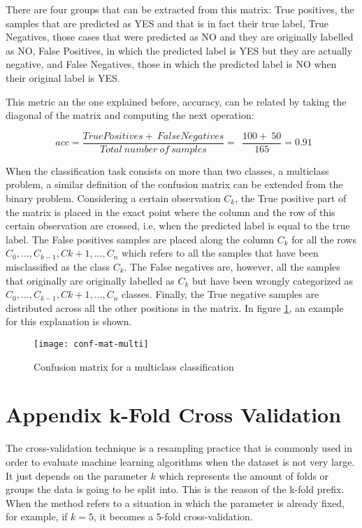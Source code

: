 	There are four groups that can be extracted from this matrix: True positives, the samples that are predicted as YES and that is in fact their true label, True Negatives, those cases that were predicted as NO and they are originally labelled as NO, False Positives, in which the predicted label is YES but they are actually negative, and False Negatives, those in which the predicted label is NO when their original label is YES.
	
	This metric an the one explained before, accuracy, can be related by taking the diagonal of the matrix and computing the next operation:
	
	\[
	\ \ acc = \frac{TruePositives +\ FalseNegatives}{Total\ number\ of\ samples} = 
	\ \ \frac{100 +\ 50}{165} = 0.91
	\]
	
	When the classification task consists on more than two classes, a multiclass problem, a similar definition of the confusion matrix can be extended from the binary problem. Considering a certain observation $C_k$, the True positive part of the matrix is placed in the exact point where the column and the row of this certain observation are crossed, i.e, when the predicted label is equal to the true label. The False positives samples are placed along the column $C_k$ for all the rows $C_0, ..., C_{k-1}, C{k+1}, ..., C_n$ which refers to all the samples that have been misclassified as the class $C_k$. The False negatives are, however, all the samples that originally are originally labelled as $C_k$ but have been wrongly categorized as $C_0, ..., C_{k-1}, C{k+1}, ..., C_n$ classes. Finally, the True negative samples are distributed across all the other positions in the matrix. In figure \ref{fig:mesh9}, an example for this explanation is shown.
	
	\begin{figure}[h]
		\centering
		\captionsetup{justification=centering}
		\texttt{[image: conf-mat-multi]}
		\caption{Confusion matrix for a multiclass classification \cite{Kruger2018}}
		\label{fig:mesh9}
	\end{figure}
	
\chapter{Appendix k-Fold Cross Validation}
\label{appendix:kfold}

	The cross-validation technique is a resampling practice that is commonly used in order to evaluate machine learning algorithms when the dataset is not very large. It just depends on the parameter $k$ which represents the amount of folds or groups the data is going to be split into. This is the reason of the k-fold prefix. When the method refers to a situation in which the parameter is already fixed, for example, if $k = 5$, it becomes a 5-fold cross-validation.
	
